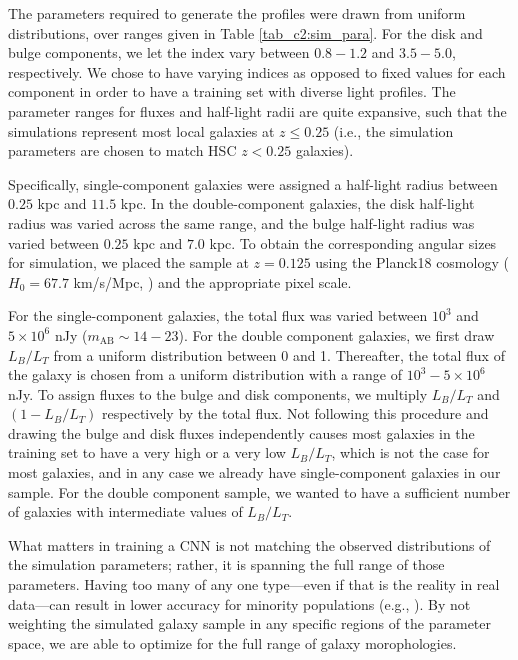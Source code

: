 The parameters required to generate the \sersic{} profiles were drawn from uniform distributions, over ranges given in Table \ref{tab_c2:sim_para}. For the disk and bulge components, we let the \sersic{} index vary between $0.8-1.2$ and $3.5-5.0$, respectively. We chose to have varying \sersic{} indices as opposed to fixed values for each component in order to have a training set with diverse light profiles. The parameter ranges for fluxes and half-light radii are quite expansive, such that the simulations represent most local galaxies \citep{binney_and_merrifield} at $z \leq 0.25$ (i.e., the simulation parameters are chosen to match HSC $z < 0.25$ galaxies).

Specifically, single-component galaxies were assigned a half-light radius between $0.25$ kpc and $11.5$ kpc. In the double-component galaxies, the disk half-light radius was varied across the same range, and the bulge half-light radius was varied between $0.25$ kpc and $7.0$ kpc. To obtain the corresponding angular sizes for simulation, we placed the sample at $ z = 0.125$ using the Planck18 cosmology ($H_0=67.7$ km/s/Mpc, \citealp{planck18}) and the appropriate pixel scale.

For the single-component galaxies, the total flux was varied between $10^3$ and $5\times10^6$ nJy ($m_{\mathrm{AB}}\sim14 - 23$). For the double component galaxies, we first draw $L_B/L_T$ from a uniform distribution between 0 and 1. Thereafter, the total flux of the galaxy is chosen from a uniform distribution with a range of $10^3 - 5\times10^6$ nJy. To assign fluxes to the bulge and disk components, we multiply $L_B/L_T$ and $(1 - L_B/L_T)$ respectively by the total flux. Not following this procedure and drawing the bulge and disk fluxes independently causes most galaxies in the training set to have a very high or a very low $L_B/L_T$, which is not the case for most galaxies, and in any case we already have single-component galaxies in our sample. For the double component sample, we wanted to have a sufficient number of galaxies with intermediate values of $L_B/L_T$.

What matters in training a CNN is not matching the observed distributions of the simulation parameters; rather, it is spanning the full range of those parameters. 
Having too many of any one type---even if that is the reality in real data---can result in lower accuracy for minority populations (e.g., \citealp{Ghosh2020GalaxyGalaxies}).
By not weighting the simulated galaxy sample in any specific regions of the parameter space, we are able to optimize \gampen{} for the full range of galaxy morophologies.

